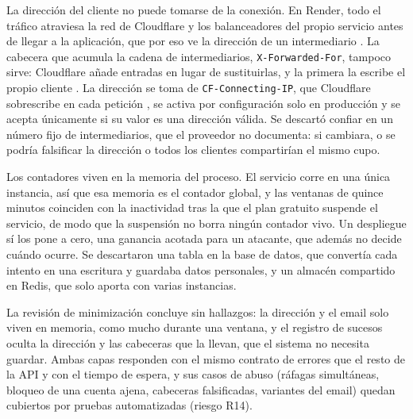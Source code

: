 La dirección del cliente no puede tomarse de la conexión.
En Render, todo el tráfico atraviesa la red de Cloudflare y los balanceadores del propio servicio antes de llegar a la aplicación, que por eso ve la dirección de un intermediario \parencite{render-ddos}.
La cabecera que acumula la cadena de intermediarios, \texttt{X-Forwarded-For}, tampoco sirve: Cloudflare añade entradas en lugar de sustituirlas, y la primera la escribe el propio cliente \parencite{render-pocketbase}.
La dirección se toma de \texttt{CF-Connecting-IP}, que Cloudflare sobrescribe en cada petición \parencite{render-pocketbase}, se activa por configuración solo en producción y se acepta únicamente si su valor es una dirección válida.
Se descartó confiar en un número fijo de intermediarios, que el proveedor no documenta: si cambiara, o se podría falsificar la dirección o todos los clientes compartirían el mismo cupo.

Los contadores viven en la memoria del proceso.
El servicio corre en una única instancia, así que esa memoria es el contador global, y las ventanas de quince minutos coinciden con la inactividad tras la que el plan gratuito suspende el servicio, de modo que la suspensión no borra ningún contador vivo.
Un despliegue sí los pone a cero, una ganancia acotada para un atacante, que además no decide cuándo ocurre.
Se descartaron una tabla en la base de datos, que convertía cada intento en una escritura y guardaba datos personales, y un almacén compartido en Redis, que solo aporta con varias instancias.

La revisión de minimización concluye sin hallazgos: la dirección y el email solo viven en memoria, como mucho durante una ventana, y el registro de sucesos oculta la dirección y las cabeceras que la llevan, que el sistema no necesita guardar.
Ambas capas responden con el mismo contrato de errores que el resto de la \ac{API} y con el tiempo de espera, y sus casos de abuso (ráfagas simultáneas, bloqueo de una cuenta ajena, cabeceras falsificadas, variantes del email) quedan cubiertos por pruebas automatizadas (riesgo R14).
